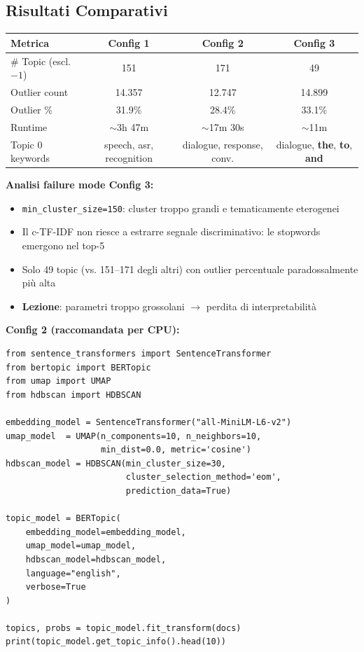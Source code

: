 \documentclass[12pt,a4paper]{article}
\begin{document}
\subsection{Risultati Comparativi}

\begin{resultbox}
\begin{center}
\begin{tabular}{lccc}
\toprule
\textbf{Metrica} & \textbf{Config 1} & \textbf{Config 2} & \textbf{Config 3} \\
\midrule
\# Topic (escl. $-1$) & 151 & 171 & 49 \\
Outlier count         & 14.357 & 12.747 & 14.899 \\
Outlier \%            & 31.9\% & 28.4\% & 33.1\% \\
Runtime               & $\sim$3h 47m & $\sim$17m 30s & $\sim$11m \\
\midrule
Topic 0 keywords & speech, asr, recognition & dialogue, response, conv. & dialogue, \textbf{the}, \textbf{to}, \textbf{and} \\
\bottomrule
\end{tabular}
\end{center}
\end{resultbox}

\textbf{Analisi failure mode Config 3:}

\begin{itemize}
  \item \texttt{min\_cluster\_size=150}: cluster troppo grandi e tematicamente eterogenei
  \item Il c-TF-IDF non riesce a estrarre segnale discriminativo: le stopwords emergono nel top-5
  \item Solo 49 topic (vs. 151--171 degli altri) con outlier percentuale paradossalmente pi\`u alta
  \item \textbf{Lezione}: parametri troppo grossolani $\to$ perdita di interpretabilit\`a
\end{itemize}

\textbf{Config 2 (raccomandata per CPU):}

\begin{codebox}
\begin{lstlisting}[style=python]
from sentence_transformers import SentenceTransformer
from bertopic import BERTopic
from umap import UMAP
from hdbscan import HDBSCAN

embedding_model = SentenceTransformer("all-MiniLM-L6-v2")
umap_model  = UMAP(n_components=10, n_neighbors=10,
                   min_dist=0.0, metric='cosine')
hdbscan_model = HDBSCAN(min_cluster_size=30,
                        cluster_selection_method='eom',
                        prediction_data=True)

topic_model = BERTopic(
    embedding_model=embedding_model,
    umap_model=umap_model,
    hdbscan_model=hdbscan_model,
    language="english",
    verbose=True
)

topics, probs = topic_model.fit_transform(docs)
print(topic_model.get_topic_info().head(10))
\end{lstlisting}
\end{codebox}
\end{document}
